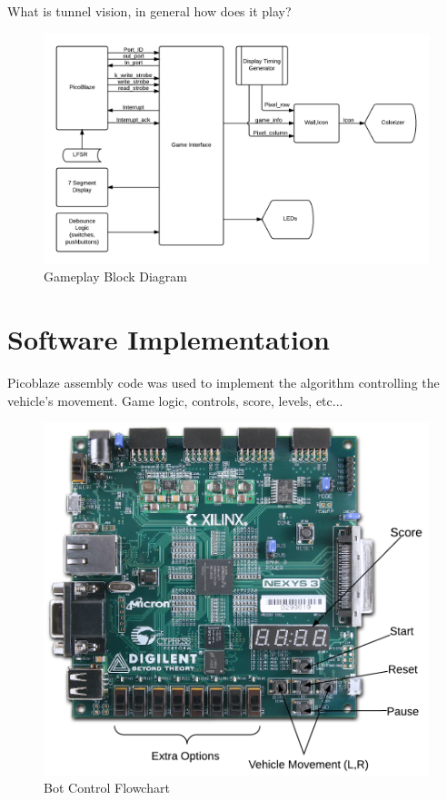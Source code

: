 \documentclass[11pt]{article}
\begin{document}
What is tunnel vision, in general how does it play?
	\begin{figure}[t!]\centering
	\includegraphics[height=0.8\textwidth]{Images/gameplay_diagram.png}
	\caption{Gameplay Block Diagram}
		\label{block_diagram}
	\end{figure}	

		
\section{Software Implementation}
		
		Picoblaze assembly code was used to implement the algorithm controlling the 
		vehicle's movement.
		Game logic, controls, score, levels, etc...
		
		\begin{figure}[t!]\centering
		\includegraphics[height=0.8\textwidth]{Images/controls_mockup.png}
		\caption{Bot Control Flowchart}
			\label{controls}
		\end{figure}	
	 	
\end{document}

